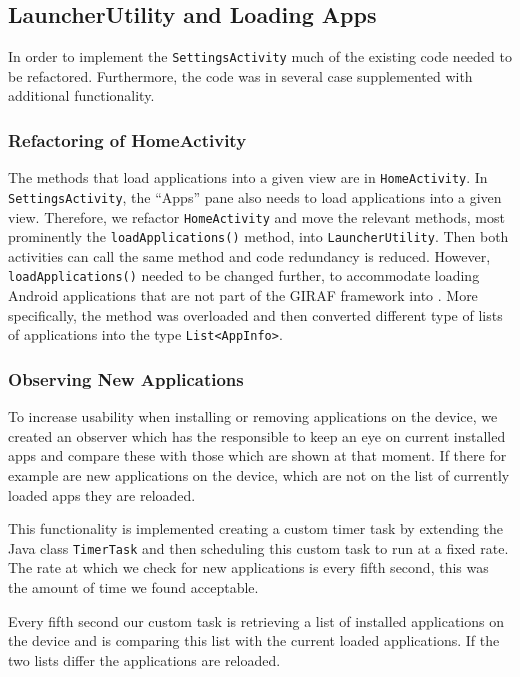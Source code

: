 \subsection{LauncherUtility and Loading Apps}\label{sect:sprint3:refactoring}
In order to implement the \lstinline!SettingsActivity! much of the existing code needed to be refactored.
Furthermore, the code was in several case supplemented with additional functionality.

\subsubsection{Refactoring of HomeActivity}
The methods that load applications into a given view are in \lstinline!HomeActivity!.
In \lstinline!SettingsActivity!, the ``Apps'' pane also needs to load applications into a given view.
Therefore, we refactor \lstinline!HomeActivity! and move the relevant methods, most prominently the \lstinline|loadApplications()| method, into \lstinline!LauncherUtility!.
Then both activities can call the same method and code redundancy is reduced. 
However, \lstinline|loadApplications()| needed to be changed further, to accommodate loading Android applications that are not part of the GIRAF framework  into \launcher. 
More specifically, the method was overloaded and then converted different type of lists of applications into the \giraf type \lstinline|List<AppInfo>|.

\subsubsection{Observing New Applications}\label{sec:sprint3:observing}
To increase usability when installing or removing applications on the device, we created an observer which has the responsible to keep an eye on current installed apps and compare these with those which are shown at that moment. If there for example are new applications on the device, which are not on the list of currently loaded apps they are reloaded.

This functionality is implemented creating a custom timer task by extending the Java class \lstinline!TimerTask! and then scheduling this custom task to run at a fixed rate. The rate at which we check for new applications is every fifth second, this was the amount of time we found acceptable.

Every fifth second our custom task is retrieving a list of installed applications on the device and is comparing this list with the current loaded applications. If the two lists differ the applications are reloaded.